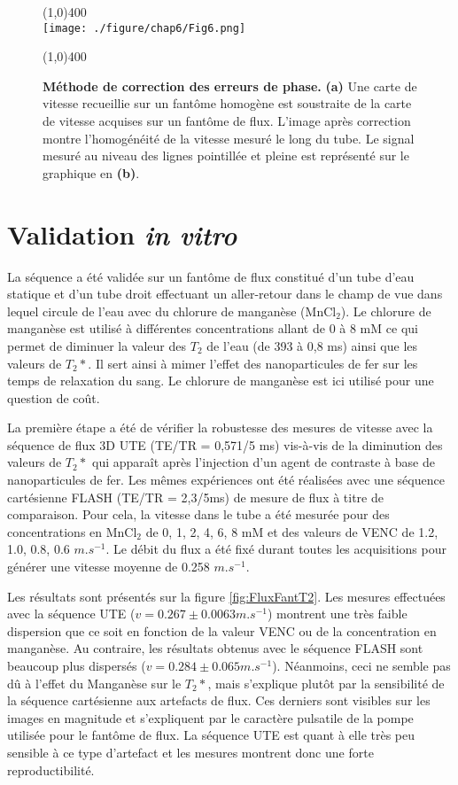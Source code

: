 \begin{figure}[H]
\centering
\line(1,0){400} \\
\texttt{[image: ./figure/chap6/Fig6.png]}
\caption[Correction de la phase]{\label{fig:CorrectionPhase} \textbf{Méthode de correction des erreurs de phase.} \textbf{(a)} 
Une carte de vitesse recueillie sur un fantôme homogène est soustraite de la carte de vitesse acquises sur un fantôme de flux. L’image après correction montre l’homogénéité de la vitesse mesuré le long du tube. Le signal mesuré au niveau des lignes pointillée et pleine est représenté sur le graphique en \textbf{(b)}.}
\line(1,0){400} \\ 
\end{figure}

\section{Validation \textit{in vitro}}

La séquence a été validée sur un fantôme de flux constitué d'un tube d'eau statique et d'un tube droit effectuant un aller-retour dans le champ de vue dans lequel circule de l'eau avec du chlorure de manganèse ($\text{MnCl}_2$). Le chlorure de manganèse est utilisé à différentes concentrations allant de 0 à 8 mM ce qui permet de diminuer la valeur des $T_2$ de l'eau (de 393 à 0,8 ms) ainsi que les valeurs de $T_2*$. Il sert ainsi à mimer l'effet des nanoparticules de fer sur les temps de relaxation du sang. Le chlorure de manganèse est ici utilisé pour une question de coût.

La première étape a été de vérifier la robustesse des mesures de vitesse avec la séquence de flux 3D UTE (TE/TR = 0,571/5 ms) vis-à-vis de la diminution des valeurs de $T_2*$ qui apparaît après l'injection d'un agent de contraste à base de nanoparticules de fer. Les mêmes expériences ont été réalisées avec une séquence cartésienne FLASH (TE/TR = 2,3/5ms) de mesure de flux à titre de comparaison.
Pour cela, la vitesse dans le tube a été mesurée pour des concentrations en $\text{MnCl}_2$ de 0, 1, 2, 4, 6, 8 mM et des valeurs de VENC de 1.2, 1.0, 0.8, 0.6 $m.s^{-1}$. Le débit du flux a été fixé durant toutes les acquisitions pour générer une vitesse moyenne de 0.258 $m.s^{-1}$.

Les résultats sont présentés sur la figure \ref{fig:FluxFantT2}. Les mesures effectuées avec la séquence UTE ($v=0.267 \pm 0.0063 m.s^{-1}$) montrent une très faible dispersion que ce soit en fonction de la valeur VENC ou de la concentration en manganèse. Au contraire, les résultats obtenus avec le séquence FLASH sont beaucoup plus dispersés ($v=0.284 \pm 0.065 m.s^{-1}$). 
Néanmoins, ceci ne semble pas dû à l'effet du Manganèse sur le $T_2*$, mais s’explique plutôt par la sensibilité de la séquence cartésienne aux artefacts de flux. Ces derniers sont visibles sur les images en magnitude et s’expliquent par le caractère pulsatile de la pompe utilisée pour le fantôme de flux. La séquence UTE est quant à elle très peu sensible à ce type d’artefact et les mesures montrent donc une forte reproductibilité. 

